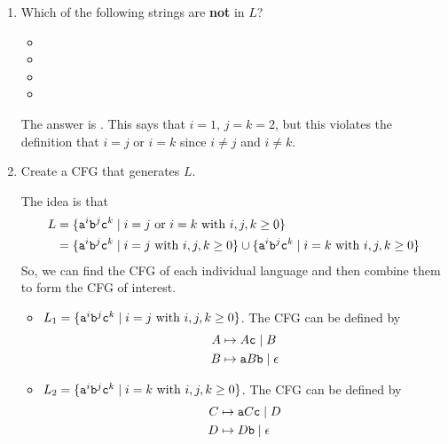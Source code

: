 \documentclass[letterpaper]{article}
\begin{document}
\begin{enumerate}
    \item Which of the following strings are \textbf{not} in $L$?
    \begin{itemize}
        \item {}
        \item {}
        \item {}
        \item {}
    \end{itemize}

    \begin{mdframed}[]
        The answer is . This says that $i = 1$, $j = k = 2$, but this violates the definition that $i = j$ or $i = k$ since $i \neq j$ and $i \neq k$. 
    \end{mdframed}


    \item Create a CFG that generates $L$. 
    \begin{mdframed}[]
        The idea is that 
        \begin{equation*}
            \begin{aligned}
                L &= \{\texttt{a}^i \texttt{b}^j \texttt{c}^k \mid i = j \text{ or } i = k \text{ with } i, j, k \geq 0\} \\ 
                    &= \{\texttt{a}^i \texttt{b}^j \texttt{c}^k \mid i = j \text{ with } i, j, k \geq 0\} \cup \{\texttt{a}^i \texttt{b}^j \texttt{c}^k \mid i = k \text{ with } i, j, k \geq 0\}
            \end{aligned}
        \end{equation*}
        So, we can find the CFG of each individual language and then combine them to form the CFG of interest. 

        \begin{itemize}
            \item $L_1 = \{\texttt{a}^i \texttt{b}^j \texttt{c}^k \mid i = j \text{ with } i, j, k \geq 0\}$. The CFG can be defined by 
            \begin{equation*}
                \begin{aligned}
                    A &\mapsto A\texttt{c} \mid B \\ 
                    B &\mapsto \texttt{a}B\texttt{b} \mid \epsilon
                \end{aligned}
            \end{equation*}

            \item $L_2 = \{\texttt{a}^i \texttt{b}^j \texttt{c}^k \mid i = k \text{ with } i, j, k \geq 0\}$. The CFG can be defined by 
            \begin{equation*}
                \begin{aligned}
                    C &\mapsto \texttt{a}C\texttt{c} \mid D \\ 
                    D &\mapsto D\texttt{b} \mid \epsilon
                \end{aligned}
            \end{equation*}
        \end{itemize}


\end{mdframed}
\end{enumerate}
\end{document}
